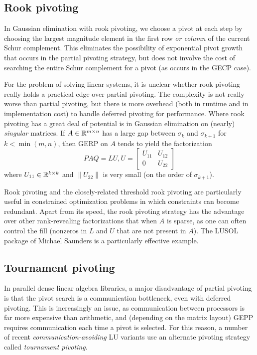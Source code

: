 \documentclass[12pt, leqno]{article} %
\begin{document}
\subsection{Rook pivoting}

In Gaussian elimination with rook pivoting, we choose a pivot at each
step by choosing the largest magnitude element in the first row
{\em or column} of the current Schur complement.  This eliminates
the possibility of exponential pivot growth that occurs in the
partial pivoting strategy, but does not involve the cost of searching
the entire Schur complement for a pivot (as occurs in the GECP case).

For the problem of solving linear systems, it is unclear whether rook
pivoting really holds a practical edge over partial pivoting.  The
complexity is not really worse than partial pivoting, but there is more
overhead (both in runtime and in implementation cost) to handle deferred
pivoting for performance.  Where rook pivoting has a great deal of
potential is in Gaussian elimination on (nearly) {\em singular} matrices.
If $A \in \mathbb{R}^{m \times n}$ has a large gap between $\sigma_{k}$
and $\sigma_{k+1}$ for $k < \min(m,n)$, then GERP on $A$ tends to yield
the factorization
\[
  PAQ = LU, U = \begin{bmatrix} U_{11} & U_12 \\ 0 & U_{22} \end{bmatrix}
\]
where $U_{11} \in \mathbb{R}^{k \times k}$ and $\|U_{22}\|$ is very small
(on the order of $\sigma_{k+1}$).

Rook pivoting and the closely-related threshold rook pivoting are
particularly useful in constrained optimization problems in which
constraints can become redundant.  Apart from its speed, the rook
pivoting strategy has the advantage over other rank-revealing
factorizations that when $A$ is sparse, as one can often control the
fill (nonzeros in $L$ and $U$ that are not present in $A$).
The LUSOL package of Michael Saunders is a particularly effective example.

\subsection{Tournament pivoting}

In parallel dense linear algebra libraries,
a major disadvantage of partial pivoting is that the pivot search is
a communication bottleneck, even with deferred pivoting.  This is
increasingly an issue, as communication between processors is far
more expensive than arithmetic, and (depending on the matrix layout)
GEPP requires communication each time a pivot is selected.
For this reason, a number of recent {\em communication-avoiding}
LU variants use an alternate pivoting strategy called
{\em tournament pivoting}.
\end{document}

